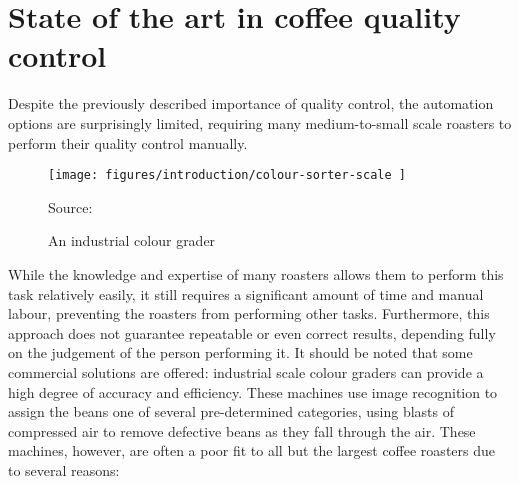 \section{State of the art in coffee quality control}
\label{sec:qc-state-of-the-art} Despite the previously described importance of quality
control, the automation options are surprisingly limited, requiring many medium-to-small
scale roasters to perform their quality control manually.
\begin{wrapfigure}
{r}{0.4\textwidth}
	\texttt{[image: 
		figures/introduction/colour-sorter-scale
	]}
	\caption*
	{Source: \cite{colourSorterImg}}
	\caption{An industrial colour grader}
	\label{fig:colourSorterExample}
\end{wrapfigure}
While the knowledge
and expertise of many roasters allows them to perform this task relatively
easily, it still requires a significant amount of time and manual labour,
preventing the roasters from performing other tasks.
Furthermore, this approach
does not guarantee repeatable or even correct results, depending fully on the judgement
of the person performing it.
It should be noted that some commercial solutions are offered: industrial scale colour
graders can provide a high degree of accuracy and efficiency.
These machines use
image recognition to assign the beans one of several pre-determined categories,
using blasts of compressed air to remove defective beans as they fall through the
air.
These machines, however, are often a poor fit to all but the largest coffee
roasters due to several reasons:

